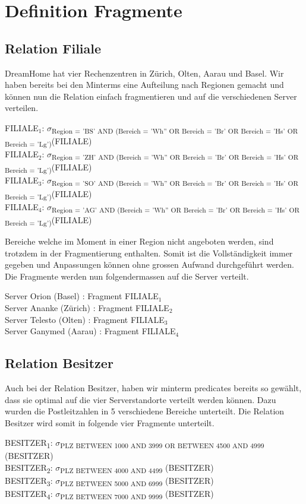 \documentclass[11pt,a4paper,parskip=half]{scrartcl}
\begin{document}
\section{Definition Fragmente}
\subsection{Relation Filiale}
DreamHome hat vier Rechenzentren in Zürich, Olten, Aarau und Basel. Wir haben bereits bei den Minterms eine Aufteilung nach Regionen gemacht und können nun die Relation einfach fragmentieren und auf die verschiedenen Server verteilen. 

FILIALE$_1$: $\sigma$\textsubscript{Region = 'BS' AND (Bereich = 'Wh'' OR Bereich = 'Br' OR Bereich = 'Hs' OR Bereich = 'Lg')}(FILIALE)\\
FILIALE$_2$: $\sigma$\textsubscript{Region = 'ZH' AND (Bereich = 'Wh'' OR Bereich = 'Br' OR Bereich = 'Hs' OR Bereich = 'Lg')}(FILIALE)\\
FILIALE$_3$: $\sigma$\textsubscript{Region = 'SO' AND (Bereich = 'Wh'' OR Bereich = 'Br' OR Bereich = 'Hs' OR Bereich = 'Lg')}(FILIALE)\\
FILIALE$_4$: $\sigma$\textsubscript{Region = 'AG' AND (Bereich = 'Wh'' OR Bereich = 'Br' OR Bereich = 'Hs' OR Bereich = 'Lg')}(FILIALE)

Bereiche welche im Moment in einer Region nicht angeboten werden, sind trotzdem in der Fragmentierung enthalten. Somit ist die Vollständigkeit immer gegeben und Anpassungen können ohne grossen Aufwand durchgeführt werden. Die Fragmente werden nun folgendermassen auf die Server verteilt.

Server Orion (Basel) : Fragment FILIALE$_1$\\
Server Ananke (Zürich) : Fragment FILIALE$_2$\\
Server Telesto (Olten) : Fragment FILIALE$_3$\\
Server Ganymed (Aarau) : Fragment FILIALE$_4$

\subsection{Relation Besitzer}
Auch bei der Relation Besitzer, haben wir minterm predicates bereits so gewählt, dass sie optimal auf die vier Serverstandorte verteilt werden können. Dazu wurden die Postleitzahlen in 5 verschiedene Bereiche unterteilt. Die Relation Besitzer wird somit in folgende vier Fragmente unterteilt.

BESITZER\textsubscript{1}: $\sigma$\textsubscript{PLZ  BETWEEN 1000 AND 3999 OR BETWEEN 4500 AND 4999} (BESITZER)\\
BESITZER\textsubscript{2}: $\sigma$\textsubscript{PLZ  BETWEEN 4000 AND 4499} (BESITZER)\\
BESITZER\textsubscript{3}: $\sigma$\textsubscript{PLZ  BETWEEN 5000 AND 6999} (BESITZER)\\
BESITZER\textsubscript{4}: $\sigma$\textsubscript{PLZ  BETWEEN 7000 AND 9999} (BESITZER)\\
\end{document}
